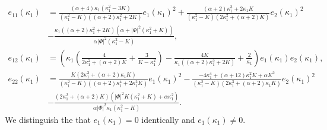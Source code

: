 \documentclass[a4paper,12pt]{amsart}
\theoremstyle{definition}
\begin{document}
\begin{equation}\label{d7}
\begin{split}
e_{11}(\kappa_1)&=\frac{(\alpha +4) \kappa_1 \left(\kappa_1^2-3 K\right)}{\left(\kappa_1^2-K\right) \left((\alpha +2) \kappa_1^2+2 K\right)}e_1(\kappa_1)^2+\frac{(\alpha +2) \kappa_1^3+2 \kappa_1 K}{\left(\kappa_1^2-K\right) \left(2 \kappa_1^2+(\alpha +2) K\right)}e_2(\kappa_1)^2\\
&-\frac{\kappa_1 \left((\alpha +2) \kappa_1^2+2 K\right) \left(\alpha +|\Phi|^2 \left(\kappa_1^2+K\right)\right)}{\alpha  |\Phi|^2 \left(\kappa_1^2-K\right)},\\
e_{12}(\kappa_1)&=\left( \kappa_1  \left(\frac{4}{2 \kappa_1^2+(\alpha +2) K}+\frac{3}{K-\kappa_1^2}\right)-\frac{4 K}{\kappa_1((\alpha +2) \kappa_1^2+2 K)}+\frac{2}{\kappa_1}\right)e_1(\kappa_1)e_2(\kappa_1),\\
e_{22}(\kappa_1)&=\frac{K \left(2 \kappa_1^3+(\alpha +2) \kappa_1 K\right)}{\left(\kappa_1^2-K\right) \left((\alpha +2) \kappa_1^4+2 \kappa_1^2 K\right)}e_1(\kappa_1)^2-\frac{-4 \kappa_1^4+(\alpha +12) \kappa_1^2 K+\alpha  K^2}{\left(\kappa_1^2-K\right) \left(2 \kappa_1^3+(\alpha +2) \kappa_1 K\right)}e_2(\kappa_1)^2\\
&-\frac{\left(2 \kappa_1^2+(\alpha +2) K\right) \left(|\Phi|^2 K \left(\kappa_1^2+K\right)+\alpha  \kappa_1^2\right)}{\alpha  |\Phi|^2 \kappa_1 \left(\kappa_1^2-K\right)}.
\end{split}
\end{equation}
We distinguish the   that $e_1(\kappa_1)=0$ identically and $e_1(\kappa_1)\not=0$.
\end{document}
